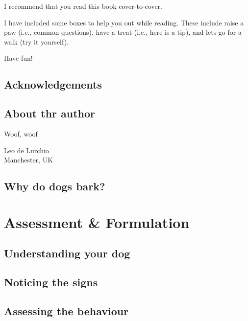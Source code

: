 \documentclass[
]{book}
\begin{document}
I recommend that you read this book cover-to-cover.

I have included some boxes to help you out while reading. These include raise a paw (i.e., common questions), have a treat (i.e., here is a tip), and lets go for a walk (try it yourself).

Have fun!

\hypertarget{acknowledgements}{%
\chapter{Acknowledgements}\label{acknowledgements}}

\hypertarget{about-thr-author}{%
\chapter{About thr author}\label{about-thr-author}}

\begin{flushright}
Woof, woof

Leo de Lurchio\\
Manchester, UK

\end{flushright}

\hypertarget{why-do-dogs-bark}{%
\chapter{Why do dogs bark?}\label{why-do-dogs-bark}}

\hypertarget{part-assessment-formulation}{%
\part{Assessment \& Formulation}\label{part-assessment-formulation}}

\hypertarget{understanding-your-dog}{%
\chapter{Understanding your dog}\label{understanding-your-dog}}

\hypertarget{noticing-the-signs}{%
\chapter{Noticing the signs}\label{noticing-the-signs}}

\hypertarget{assessing-the-behaviour}{%
\chapter{Assessing the behaviour}\label{assessing-the-behaviour}}
\end{document}
